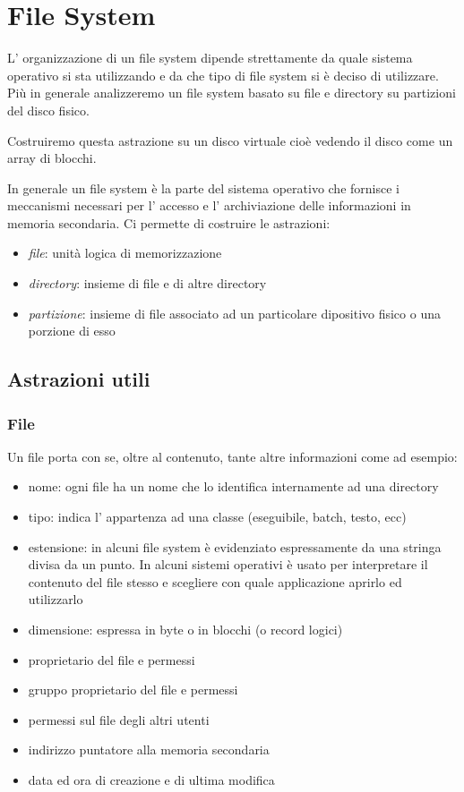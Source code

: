 \section{File System}
L' organizzazione di un file system dipende strettamente da quale sistema operativo si sta utilizzando e da che tipo di file system si è deciso di utilizzare.
Più in generale analizzeremo un file system basato su file e directory su partizioni del disco fisico.

Costruiremo questa astrazione su un disco virtuale cioè vedendo il disco come un array di blocchi.

In generale un file system è la parte del sistema operativo che fornisce i meccanismi necessari per l' accesso e l' archiviazione delle informazioni in memoria secondaria.
Ci permette di costruire le astrazioni:
\begin{itemize}
    \item \emph{file}: unità logica di memorizzazione
    \item \emph{directory}: insieme di file e di altre directory
    \item \emph{partizione}: insieme di file associato ad un particolare dipositivo fisico o una porzione di esso
\end{itemize}

\subsection{Astrazioni utili}
\subsubsection{File}
Un file porta con se, oltre al contenuto, tante altre informazioni come ad esempio:
\begin{itemize}
    \item nome: ogni file ha un nome che lo identifica internamente ad una directory
    \item tipo: indica l' appartenza ad una classe (eseguibile, batch, testo, ecc)

    \item estensione: in alcuni file system è evidenziato espressamente da una stringa divisa da un punto.
    In alcuni sistemi operativi è usato per interpretare il contenuto del file stesso e scegliere con quale applicazione aprirlo ed utilizzarlo
    
    \item dimensione: espressa in byte o in blocchi (o record logici)

    \item proprietario del file e permessi
    \item gruppo proprietario del file e permessi
    \item permessi sul file degli altri utenti
    
    \item indirizzo puntatore alla memoria secondaria
    \item data ed ora di creazione e di ultima modifica
\end{itemize}

